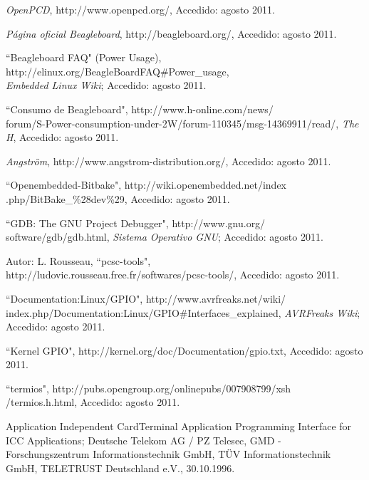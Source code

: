 \documentclass[%
        final,
        notitlepage,
        narroweqnarray,
        inline,
        ]{ieee}
\begin{document}

%
%
\begin{thebibliography}{15}

 \textit{OpenPCD}, http://www.openpcd.org/, Accedido: agosto 2011.

 \textit{Página oficial Beagleboard}, http://beagleboard.org/, Accedido: agosto 2011.

 ``Beagleboard FAQ" (Power Usage),\\
 http://elinux.org/BeagleBoardFAQ\#Power\_usage,\\
 \textit{Embedded Linux Wiki}; Accedido: agosto 2011.

 ``Consumo de Beagleboard", http://www.h-online.com/news/\\
forum/S-Power-consumption-under-2W/forum-110345/msg-14369911/read/, \textit{The H}, Accedido: agosto 2011.

 \textit{Angström}, http://www.angstrom-distribution.org/, Accedido: agosto 2011.

 ``Openembedded-Bitbake", http://wiki.openembedded.net/index\\
.php/BitBake\_\%28dev\%29, Accedido: agosto 2011.

 ``GDB: The GNU Project Debugger", http://www.gnu.org/\\
software/gdb/gdb.html, \textit{Sistema Operativo GNU}; Accedido: agosto 2011.

 Autor: L. Rousseau, ``pcsc-tools", \\
http://ludovic.rousseau.free.fr/softwares/pcsc-tools/, Accedido: agosto 2011.

 ``Documentation:Linux/GPIO", http://www.avrfreaks.net/wiki/\\
index.php/Documentation:Linux/GPIO\#Interfaces\_explained, \textit{AVRFreaks Wiki}; Accedido: agosto 2011.

 ``Kernel GPIO", http://kernel.org/doc/Documentation/gpio.txt, Accedido: agosto 2011.

 ``termios", http://pubs.opengroup.org/onlinepubs/007908799/xsh\\
/termios.h.html, Accedido: agosto 2011.

 Application Independent CardTerminal Application Programming Interface for ICC Applications; 
Deutsche Telekom AG / PZ Telesec, GMD - Forschungszentrum Informationstechnik GmbH, TÜV Informationstechnik GmbH, TELETRUST Deutschland e.V., 30.10.1996.


\end{thebibliography}
\end{document}
